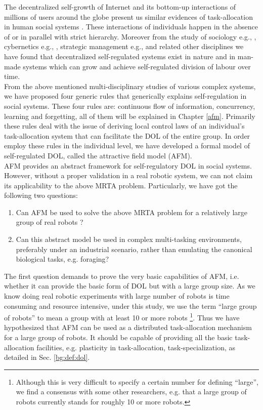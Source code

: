 The decentralized self-growth of Internet and its bottom-up interactions of millions of users around the globe present us similar evidences of task-allocation in human social systems \cite{Andriani+2004}. These interactions of individuals happen in the absence of or in parallel with strict hierarchy. Moreover from the study of sociology e.g., \cite{Sayer+1992}, cybernetics e.g., \cite{Beer1981}, strategic management e.g., \cite{Kogut2000} and related other disciplines we have found that decentralized self-regulated systems exist in nature and in man-made systems which can grow and achieve self-regulated division of labour over time.\\
From the above mentioned multi-disciplinary studies of various complex systems, we have proposed four generic rules that generically explains self-regulation in social systems. These four rules are: continuous flow of information, concurrency, learning and forgetting, all of them will be explained in Chapter \ref{afm}. Primarily these rules  deal with the issue of deriving local control laws of an individual's task-allocation system that can facilitate the DOL of the entire group. In order employ these rules in the individual level, we have developed a formal model of self-regulated DOL, called the attractive field model (AFM).\\
AFM provides an abstract framework for self-regulatory DOL in social systems. However, without a proper validation in a real robotic system, we can not claim its applicability to the above MRTA problem. Particularly, we have got the following two questions:
\begin{enumerate}
\item Can AFM  be used to solve the above MRTA problem for a relatively large group of real robots ?
\item Can this abstract model be used  in complex multi-tasking environments, preferably under an industrial scenario, rather than emulating the canonical biological tasks, e.g. foraging?
\end{enumerate}
The first question demands to prove the very basic capabilities of AFM, i.e. whether it can provide the basic form of DOL but with a large group size. As we know doing real robotic experiments with large number of robots is time consuming and resource intensive, under this study, we use the term ``large group of robots'' to mean a group with at least 10 or more robots \footnote{Although this is very difficult to specify a certain number for defining ``large'', we find a consensus with some other researchers, e.g. \protect\cite{Lerman+2006} that a large group of robots currently  stands for roughly 10 or more robots.}. Thus we have hypothesized that AFM can be used as a distributed task-allocation mechanism for a large group of robots. It should be capable of providing all the basic task-allocation facilities, e.g. plasticity in task-allocation, task-specialization, as detailed in Sec. \ref{bg:def:dol}.\\
